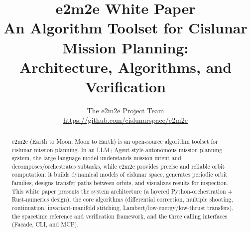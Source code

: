 \documentclass[11pt]{article}
\title{\color{e2blue}\textbf{e2m2e White Paper}\\[4pt]
  \large An Algorithm Toolset for Cislunar Mission Planning:\\
  Architecture, Algorithms, and Verification}
\author{The e2m2e Project Team \\ \small \url{https://github.com/cislunarspace/e2m2e}}
\date{\eEmVersion}
\begin{document}
\maketitle
\thispagestyle{empty}

\begin{abstract}
\noindent
e2m2e (Earth to Moon, Moon to Earth) is an open-source algorithm toolset for
cislunar mission planning. In an LLM+Agent-style autonomous mission planning
system, the large language model understands mission intent and
decomposes/orchestrates subtasks, while e2m2e provides precise and reliable
orbit computation: it builds dynamical models of cislunar space, generates
periodic orbit families, designs transfer paths between orbits, and visualizes
results for inspection. This white paper presents the system architecture
(a layered Python-orchestration + Rust-numerics design), the core algorithms
(differential correction, multiple shooting, continuation, invariant-manifold
stitching, Lambert/low-energy/low-thrust transfers), the spacetime reference
and verification framework, and the three calling interfaces (Facade, CLI,
and MCP).
\end{abstract}

\vspace{1em}
\tableofcontents
\newpage










\end{document}
